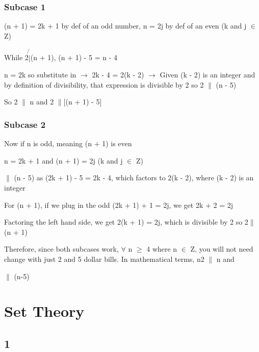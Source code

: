 \documentclass{article}
\begin{document}
\subsubsection{Subcase 1}
\noindent (n + 1) = 2k + 1 by def of an odd number, n = 2j by def of an even (k and j $\in$ Z) \vspace{0.5cm}

\noindent While 2$\not{|}$(n + 1), (n + 1) - 5 = n - 4 \vspace{0.5cm}

\noindent n = 2k so substitute in $\rightarrow$ 2k - 4 = 2(k - 2) $\rightarrow$ Given (k - 2) is an integer and by definition of divisibility, that expression is divisible by 2 so 2 $\|$ (n - 5) \vspace{0.5cm}

\noindent So 2 $\|$ n and 2 $\|$[(n + 1) - 5] \vspace{0.5cm}
\subsubsection{Subcase 2}
\noindent Now if n is odd, meaning (n + 1) is even \vspace{0.5cm}

\noindent n = 2k + 1 and (n + 1) = 2j (k and j $\in$ Z) \vspace{0.5cm}

 $\|$ (n - 5) as (2k + 1) - 5 = 2k - 4, which factors to 2(k - 2), where (k - 2) is an integer \vspace{0.5cm}

\noindent For (n + 1), if we plug in the odd (2k + 1) + 1 = 2j, we get 2k + 2 = 2j \par

\noindent Factoring the left hand side, we get 2(k + 1) = 2j, which is divisible by 2 so 2$\|$(n + 1) \vspace{0.5cm}

\noindent Therefore, since both subcases work, $\forall$ n $\geq$ 4 where n $\in$ Z, you will not need change with just 2 and 5 dollar bills.  In mathematical terms, n2 $\|$ n and \par{} $\|$ (n-5) \vspace{0.5cm}

\section{Set Theory}

\subsection{1}
\end{document}
